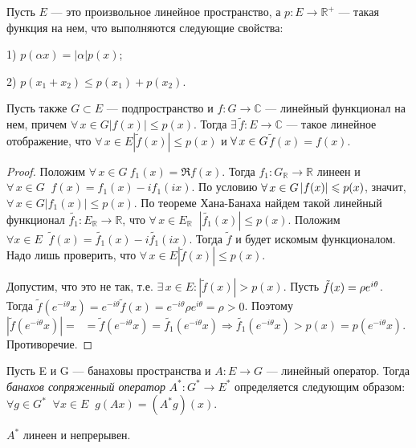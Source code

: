 \documentclass[12pt,titlepage, a4paper]{article}
\begin{document}
\begin{theorem}
Пусть $E$ --- это произвольное линейное пространство, а $p\colon
E\to\mathbb{R}^+$ --- такая функция на нем, что выполняются
следующие свойства:

1\textup{)} $p(\alpha x)=|\alpha| p(x)$;

2\textup{)} $p(x_1+x_2)\leqslant p(x_1)+p(x_2)$.

Пусть также $G\subset E$ --- подпространство и $f\colon
G\to\mathbb{C}$ --- линейный функционал на нем, причем
$\forall\,x\in G$\;\;$|f(x)|\leqslant p(x)$. Тогда
$\exists\,\tilde{f}\colon E\to \mathbb{C}$ --- такое линейное
отображение, что $\forall\,x\in E$\;\;$|\tilde{f}(x)|\leqslant p(x)$
и $\forall\,x\p\in G$\;\;$\tilde{f}(x)=f(x)$.
\end{theorem}

\begin{proof}
Положим $\forall\, x\in G\ f_1(x)=\Re f(x)$. Тогда $f_1\colon
G_{\mathbb{R}}\rightarrow \mathbb{R}$ линеен и $\forall\, x \in
G\;\; f(x)=f_1(x)-if_1(ix)$. По условию $\forall\,x\p\in
G$\;\;$|f(x)|\p\leqslant p(x)$, значит, $\forall\,x\in
G$\;\;$|f_1(x)|\leqslant p(x)$. По теореме Хана-Банаха найдем такой
линейный функционал $\tilde{f_1}\colon E_{\mathbb{R}}\rightarrow
\mathbb{R}$, что $\forall\, x\in E_{\mathbb{R}}
\;\;|\tilde{f_1}(x)|\leqslant p(x)$. Положим $\forall x \in E\;\;
\tilde{f}(x)=\tilde{f_1}(x)-i\tilde{f_1}(ix)$. Тогда $\tilde{f}$ и
будет искомым функционалом. Надо лишь проверить, что $\forall\,x\in
E$\;\;$|\tilde{f}(x)|\leqslant p(x)$.

Допустим, что это не так, т.е. $\exists\, x\in E:
|\tilde{f}(x)|>p(x)$. Пусть $\tilde{f}(x)\p=\rho e^{i\theta}$. Тогда
$\tilde{f}(e^{-i\theta}x)=e^{-i\theta}\tilde{f}(x)=e^{-i\theta}\rho
e^{i\theta}=\rho>0$. Поэтому
$|\tilde{f}(e^{-i\theta}x)|=\;\;=\tilde{f}(e^{-i\theta}x)=\tilde{f_1}(e^{-i\theta}x)\Rightarrow
\tilde{f_1}(e^{-i\theta}x)>p(x)=p(e^{-i\theta}x)$. Противоречие.
\end{proof}

\begin{defen}
Пусть E и G --- банаховы пространства и $A\colon E\rightarrow G$
--- линейный оператор. Тогда \emph{банахов сопряженный оператор} $A^*\colon
G^*\rightarrow E^*$ определяется следующим образом: $\forall g\in
G^* \;\;\forall x\in E \;\;g(Ax)=(A^*g)(x)$.
\end{defen}

\begin{predl}
$A^*$ линеен и непрерывен.
\end{predl}
\end{document}
